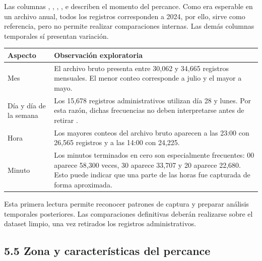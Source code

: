\documentclass[11pt,letterpaper]{article}
\begin{document}
\begin{nota}
Las columnas , , , ,
 e  describen el momento del percance. Como era
esperable en un archivo anual, todos los registros corresponden a 2024, por ello,
 sirve como referencia, pero no permite realizar comparaciones
internas. Las demás columnas temporales sí presentan variación.

\vspace{0.4em}
\begin{tabularx}{\textwidth}{L{3.4cm}Y}
    \toprule
    \textbf{Aspecto} & \textbf{Observación exploratoria} \\
    \midrule
    Mes
        & El archivo bruto presenta entre 30,062 y 34,665 registros mensuales.
          El menor conteo corresponde a julio y el mayor a mayo. \\
    Día y día de la semana
        & Los 15,678 registros administrativos utilizan día 28 y lunes. Por
          esta razón, dichas frecuencias no deben interpretarse antes de
          retirar . \\
    Hora
        & Los mayores conteos del archivo bruto aparecen a las 23:00 con 26,565
          registros y a las 14:00 con 24,225. \\
    Minuto
        & Los minutos terminados en cero son especialmente frecuentes:
          00 aparece 58,300 veces, 30 aparece 33,707 y 20 aparece 22,680.
          Esto puede indicar que una parte de las horas fue capturada de forma
          aproximada. \\
    \bottomrule
\end{tabularx}

\vspace{0.4em}
Esta primera lectura permite reconocer patrones de captura y preparar análisis
temporales posteriores. Las comparaciones definitivas deberán realizarse sobre
el dataset limpio, una vez retirados los registros administrativos.
\end{nota}

\subsection*{5.5 Zona y características del percance}
\end{document}
